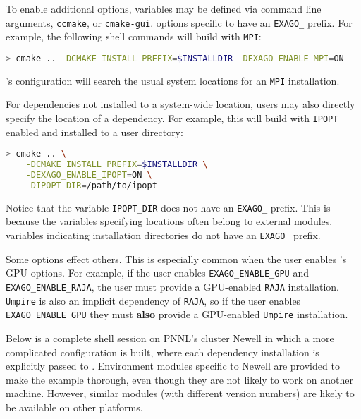 To enable additional options, \cmake variables may be defined via \cmake command line arguments, \texttt{ccmake}, or \texttt{cmake-gui}.
\cmake options specific to \exago have an \texttt{EXAGO\_} prefix.
For example, the following shell commands will build \exago with \texttt{MPI}:

\begin{lstlisting}[language=bash]
> cmake .. -DCMAKE_INSTALL_PREFIX=$INSTALLDIR -DEXAGO_ENABLE_MPI=ON
\end{lstlisting}

\noindent
\exago's \cmake configuration will search the usual system locations for an \texttt{MPI} installation.

For dependencies not installed to a system-wide location, users may also directly specify the location of a dependency.
For example, this will build \exago with \texttt{IPOPT} enabled and installed to a user directory:

\begin{lstlisting}[language=bash]
> cmake .. \
    -DCMAKE_INSTALL_PREFIX=$INSTALLDIR \
    -DEXAGO_ENABLE_IPOPT=ON \
    -DIPOPT_DIR=/path/to/ipopt
\end{lstlisting}

\noindent
Notice that the \cmake variable \texttt{IPOPT\_DIR} does not have an \texttt{EXAGO\_} prefix.
This is because the variables specifying locations often belong to external \cmake modules.
\cmake variables indicating installation directories do not have an \texttt{EXAGO\_} prefix.

Some \cmake options effect others.
This is especially common when the user enables \exago's GPU options.
For example, if the user enables \texttt{EXAGO\_ENABLE\_GPU} and \texttt{EXAGO\_ENABLE\_RAJA}, the user must provide a GPU-enabled \texttt{RAJA} installation.
\texttt{Umpire} is also an implicit dependency of \texttt{RAJA}, so if the user enables \texttt{EXAGO\_ENABLE\_GPU} they must \textbf{also} provide a GPU-enabled \texttt{Umpire} installation.

Below is a complete shell session on PNNL's cluster Newell in which a more complicated \exago configuration is built, where each dependency installation is explicitly passed to \cmake.
Environment modules specific to Newell are provided to make the example
thorough, even though they are not likely to work on another machine. However,
similar modules (with different version numbers) are likely to be available on
other platforms.

